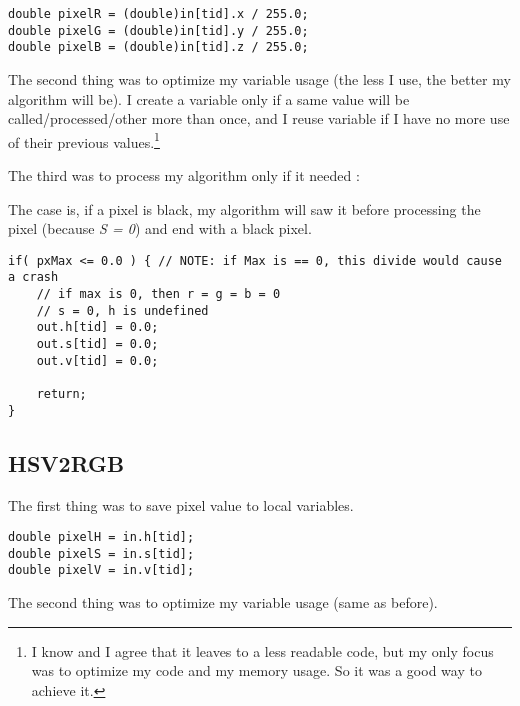 \documentclass[11pt]{article} %
\begin{document}
\begin{lstlisting}[style=CStyle]
double pixelR = (double)in[tid].x / 255.0;
double pixelG = (double)in[tid].y / 255.0;
double pixelB = (double)in[tid].z / 255.0;
\end{lstlisting}

The second thing was to optimize my variable usage (the less I use, the better my algorithm will be). I create a variable only if a same value will be called/processed/other more than once, and I reuse variable if I have no more use of their previous values.\footnote{I know and I agree that it leaves to a less readable code, but my only focus was to optimize my code and my memory usage. So it was a good way to achieve it.}

The third was to process my algorithm only if it needed :

The case is, if a pixel is black, my algorithm will saw it before processing the pixel (because {\it S = 0}) and end with a black pixel.

\begin{lstlisting}[style=CStyle]
if( pxMax <= 0.0 ) { // NOTE: if Max is == 0, this divide would cause a crash
	// if max is 0, then r = g = b = 0              
	// s = 0, h is undefined
	out.h[tid] = 0.0;
	out.s[tid] = 0.0;
	out.v[tid] = 0.0;

	return;
}
\end{lstlisting}

\subsection{HSV2RGB}

The first thing was to save pixel value to local variables.

\begin{lstlisting}[style=CStyle]
double pixelH = in.h[tid];
double pixelS = in.s[tid];
double pixelV = in.v[tid];
\end{lstlisting}

The second thing was to optimize my variable usage (same as before).
\end{document}
